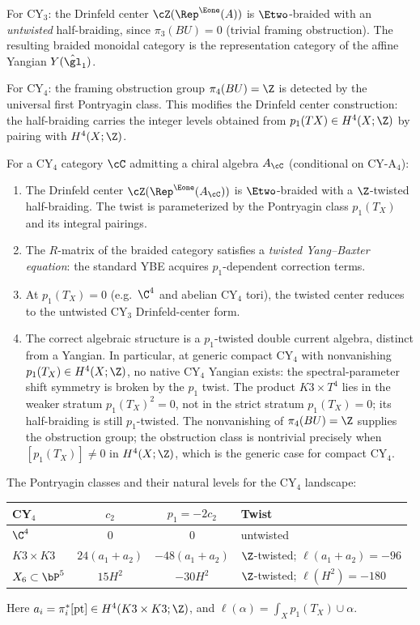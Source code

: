 For CY$_3$: the Drinfeld center $\cZ(\Rep^{\Eone}(A))$ is $\Etwo$-braided with an \emph{untwisted} half-braiding, since $\pi_3(BU) = 0$ (trivial framing obstruction). The resulting braided monoidal category is the representation category of the affine Yangian $Y(\hat{\gl}_1)$.

For CY$_4$: the framing obstruction group $\pi_4(BU) = \Z$ is detected by the universal first Pontryagin class. This modifies the Drinfeld center construction: the half-braiding carries the integer levels obtained from \(p_1(TX)\in H^4(X;\Z)\) by pairing with \(H^4(X;\Z)\).

\begin{conjecture}[\texorpdfstring{$p_1$}{p-1}-twisted Drinfeld center at \texorpdfstring{$d = 4$}{d = 4}]
\label{conj:cy4-twisted-center}
\ClaimStatusConjectured
For a CY$_4$ category $\cC$ admitting a chiral algebra $A_\cC$ (conditional on CY-A$_4$):
\begin{enumerate}[label=\textup{(\roman*)}]
 \item The Drinfeld center $\cZ(\Rep^{\Eone}(A_\cC))$ is $\Etwo$-braided with a $\Z$-twisted half-braiding. The twist is parameterized by the Pontryagin class \(p_1(T_X)\) and its integral pairings.
 \item The $R$-matrix of the braided category satisfies a \emph{twisted Yang--Baxter equation}: the standard YBE acquires $p_1$-dependent correction terms.
 \item At \(p_1(T_X)=0\) (e.g.\ \(\C^4\) and abelian CY$_4$ tori), the twisted center reduces to the untwisted CY$_3$ Drinfeld-center form.
 \item The correct algebraic structure is a $p_1$-twisted double current algebra, distinct from a Yangian. In particular, at generic compact CY$_4$ with nonvanishing $p_1(T_X) \in H^4(X; \Z)$, no native CY$_4$ Yangian exists: the spectral-parameter shift symmetry is broken by the $p_1$ twist. The product \(K3\times T^4\) lies in the weaker stratum \(p_1(T_X)^2=0\), not in the strict stratum \(p_1(T_X)=0\); its half-braiding is still \(p_1\)-twisted. The nonvanishing of $\pi_4(BU) = \Z$ supplies the obstruction group; the obstruction class is nontrivial precisely when $[p_1(T_X)] \neq 0$ in $H^4(X; \Z)$, which is the generic case for compact CY$_4$.
\end{enumerate}
\end{conjecture}

The Pontryagin classes and their natural levels for the CY$_4$ landscape:
\begin{center}
\renewcommand{\arraystretch}{1.3}
\begin{tabular}{lccl}
 \toprule
 CY$_4$ & $c_2$ & $p_1 = -2c_2$ & Twist \\
 \midrule
 $\C^4$ & $0$ & $0$ & untwisted \\
 $K3 \times K3$ & $24(a_1+a_2)$ & $-48(a_1+a_2)$ & $\Z$-twisted; $\ell(a_1+a_2)=-96$ \\
 $X_6 \subset \bP^5$ & $15 H^2$ & $-30 H^2$ & $\Z$-twisted; $\ell(H^2)=-180$ \\
 \bottomrule
\end{tabular}
\end{center}
Here \(a_i=\pi_i^*[\mathrm{pt}]\in H^4(K3\times K3;\Z)\), and
\(\ell(\alpha)=\int_X p_1(T_X)\cup\alpha\).


